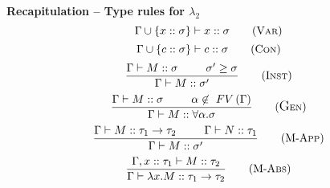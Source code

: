 \documentclass{beamer}
\begin{document}
\begin{frame}[fragile]{\bf Recapitulation -- Type rules for $\lambda_2$}
\vspace{-0.5em}
\begin{equation}
    \Gamma\cup\{x :: \sigma\} \vdash x :: \sigma \tag{V{\scriptsize AR}}
\end{equation}
\begin{equation}
    \Gamma\cup\{c :: \sigma\} \vdash c :: \sigma \tag{C{\scriptsize ON}}
\end{equation}\vspace{-0.1em}
\begin{equation}
    \frac{\Gamma\vdash M::\sigma \;\;\;\;\;\;\;\;\; \sigma'\geq\sigma}{\Gamma\vdash M::\sigma'}\tag{I{\scriptsize NST}}
\end{equation}\vspace{-0.1em}
\begin{equation}
    \frac{\Gamma\vdash M::\sigma \;\;\;\;\;\;\;\;\; \alpha\not\in\ FV\left(\Gamma\right)}{\Gamma\vdash M::\forall\alpha.\sigma}\tag{{\large G}{\scriptsize EN}}
\end{equation}\vspace{-0.1em}
\begin{equation}
    \frac{\Gamma\vdash M::\tau_1\rightarrow\tau_2 \;\;\;\;\;\;\;\;\; \Gamma\vdash N::\tau_1}{\Gamma\vdash M::\sigma'}\tag{M-A{\scriptsize PP}}
\end{equation}\vspace{-0.1em}
\begin{equation}
    \frac{\Gamma,x ::\tau_1\vdash M ::\tau_2}{\Gamma\vdash \lambda x.M::\tau_1\rightarrow\tau_2}\tag{M-A{\scriptsize BS}}
\end{equation}
\end{frame}
\end{document}
